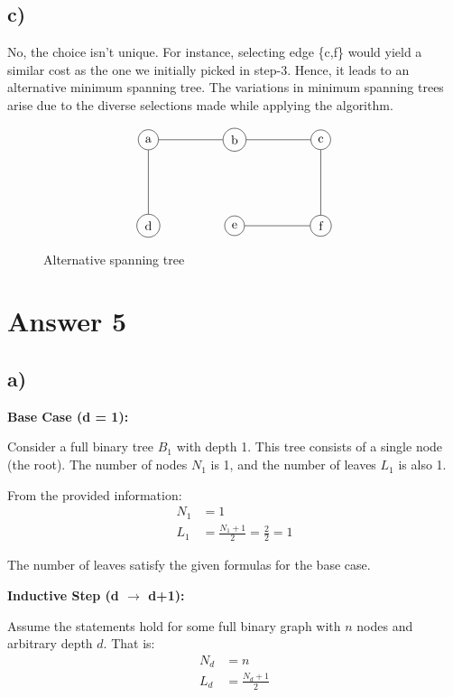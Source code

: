 \documentclass[12pt]{article}
\begin{document}
\subsection*{c)}

No, the choice isn't unique. For instance, selecting edge \{c,f\} would yield a similar cost as the one we initially picked in step-3. Hence, it leads to an alternative minimum spanning tree. The variations in minimum spanning trees arise due to the diverse selections made while applying the algorithm.

\begin{figure}[H] 
    \[
\begin{tikzpicture}[scale=0.8]
    \node[circle,draw,] (a) at (-3,0) {a};
    \node[circle,draw,] (b) at (0,0) {b};
    \node[circle,draw,] (c) at (3,0) {c};
    \node[circle,draw,] (d) at (-3,-3) {d};
    \node[circle,draw,](e) at (0,-3) {e};
    \node[circle,draw,] (f) at (3,-3) {f};
    
    \draw (a) -- (b);
    \draw (c) -- (f);
    \draw (e) -- (f);
    \draw (a) -- (d);
    \draw (b) -- (c);
    
\end{tikzpicture}
\]
\caption{Alternative spanning tree}
\end{figure}

\section*{Answer 5}

\subsection*{a)}

\textbf{Base Case (d = 1):}

Consider a full binary tree \( B_1 \) with depth 1. This tree consists of a single node (the root). The number of nodes \( N_1 \) is 1, and the number of leaves \( L_1 \) is also 1.

From the provided information:
\begin{align*}
N_1 &= 1 \\
L_1 &= \frac{N_1 + 1}{2} = \frac{2}{2} = 1
\end{align*}

The number of leaves satisfy the given formulas for the base case.

\textbf{Inductive Step (d \(\rightarrow\) d+1):}

Assume the statements hold for some full binary graph with \(n\) nodes and arbitrary depth \( d \). That is:
\begin{align*}
N_d &= n \\
L_d &= \frac{N_d + 1}{2}
\end{align*}
\end{document}
